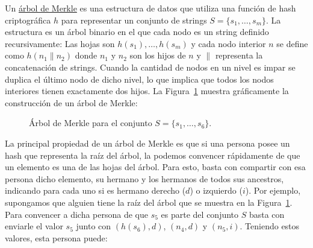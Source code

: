 

Un \href{https://en.wikipedia.org/wiki/Merkle_tree}{árbol de Merkle} es una estructura de datos que utiliza una función de hash criptográfica $h$ para representar un conjunto de strings $S=\{s_1,\ldots,s_m\}$. La estructura es un árbol binario en el que cada nodo es un string definido recursivamente: Las hojas son $h(s_1),\ldots,h(s_m)$ y cada nodo interior $n$ se define como $h(n_1 \| n_2)$ donde $n_1$ y $n_2$ son los hijos de $n$ y $\|$ representa la concatenación de strings. Cuando la cantidad de nodos en un nivel es impar se duplica el último nodo de dicho nivel, lo que implica que todos los nodos interiores tienen exactamente dos hijos. La Figura~\ref{fig:merkle} muestra gráficamente la construcción de un árbol de Merkle:

\begin{figure}[h]
  \scriptsize
  \begin{center}
  \end{center}
  \caption{Árbol de Merkle para el conjunto $S=\{s_1,\ldots,s_6\}$.}
  \label{fig:merkle}
\end{figure}

La principal propiedad de un árbol de Merkle es que si una persona posee un hash que representa la raíz del árbol, la podemos convencer rápidamente de que un elemento es una de las hojas del árbol. Para esto, basta con compartir con esa persona dicho elemento, su hermano y los hermanos de todos sus ancestros, indicando para cada uno si es hermano derecho ($d$) o izquierdo ($i$). Por ejemplo, supongamos que alguien tiene la raíz del árbol que se muestra en la Figura~\ref{fig:merkle}. Para convencer a dicha persona de que $s_5$ es parte del conjunto $S$ basta con enviarle el valor $s_5$ junto con $(h(s_6),d)$, $(n_4,d)$ y $(n_5,i)$. Teniendo estos valores, esta persona puede:

